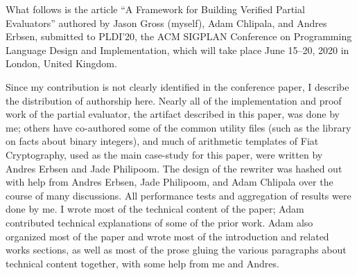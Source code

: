 \documentclass{article}
\begin{document}
What follows is the article ``A Framework for Building Verified Partial Evaluators'' authored by Jason Gross (myself), Adam Chlipala, and Andres Erbsen, submitted to PLDI'20, the ACM SIGPLAN Conference on Programming Language Design and Implementation, which will take place June 15--20, 2020 in London, United Kingdom.

Since my contribution is not clearly identified in the conference paper, I describe the distribution of authorship here.
Nearly all of the implementation and proof work of the partial evaluator, the artifact described in this paper, was done by me; others have co-authored some of the common utility files (such as the library on facts about binary integers), and much of arithmetic templates of Fiat Cryptography, used as the main case-study for this paper, were written by Andres Erbsen and Jade Philipoom.
The design of the rewriter was hashed out with help from Andres Erbsen, Jade Philipoom, and Adam Chlipala over the course of many discussions.
All performance tests and aggregation of results were done by me.
I wrote most of the technical content of the paper; Adam contributed technical explanations of some of the prior work.
Adam also organized most of the paper and wrote most of the introduction and related works sections, as well as most of the prose gluing the various paragraphs about technical content together, with some help from me and Andres.
\end{document}
